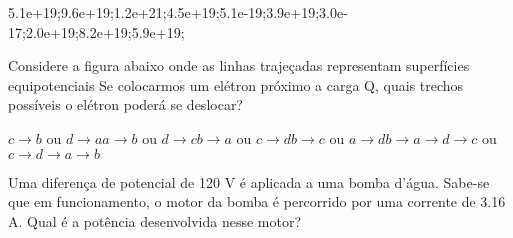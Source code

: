 \documentclass[12pt, addpoints]{exam}
\begin{document}
\begin{questions}
\begin{multicols*}{2}
\begin{oneparchoices}
\choice 5.1e+19;\choice 9.6e+19;\choice 1.2e+21;\choice 4.5e+19;\choice 5.1e-19;\choice 3.9e+19;\choice 3.0e-17;\choice 2.0e+19;\choice 8.2e+19;\choice 5.9e+19;\end{oneparchoices}
\question[20] Considere a figura abaixo onde as linhas trajeçadas representam superfícies equipotenciais Se colocarmos um elétron próximo a carga Q, quais trechos possíveis o elétron poderá se deslocar?
        
        \begin{center}
            \begin{minipage}[c]{0.5\linewidth}
            \end{minipage}
        \end{center}
        
        

\begin{choices}
\choice $c\rightarrow b$ ou $d\rightarrow a$\choice $a\rightarrow b$ ou $d\rightarrow c$\choice $b\rightarrow a$ ou $c\rightarrow d$\choice $b\rightarrow c$ ou $a\rightarrow d$\choice $b\rightarrow a\rightarrow d\rightarrow c$ ou $c\rightarrow d\rightarrow a\rightarrow b$\end{choices}
\question[20] Uma diferença de potencial de 120 V é aplicada a uma bomba d’água. Sabe-se que em funcionamento, o motor da bomba é percorrido por uma corrente de    3.16 A. Qual é a potência desenvolvida nesse motor?


\end{multicols*}
\end{questions}
\end{document}
